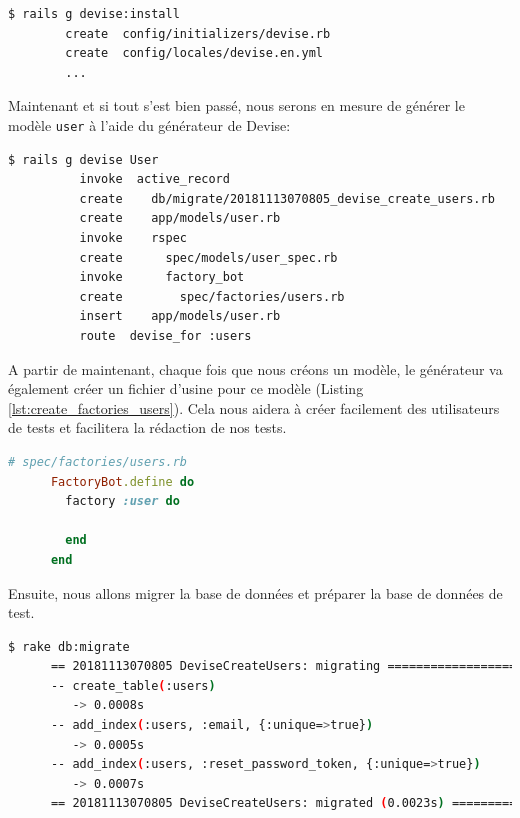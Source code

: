 \documentclass[]{report}
\begin{document}
    \begin{scriptsize}
      \begin{lstlisting}[language=bash]
      $ rails g devise:install
        create  config/initializers/devise.rb
        create  config/locales/devise.en.yml
        ...
      \end{lstlisting}
    \end{scriptsize}

    Maintenant et si tout s'est bien passé, nous serons en mesure de générer le modèle \verb|user| à l'aide du générateur de Devise:

    \begin{scriptsize}
      \begin{lstlisting}[language=bash]
      $ rails g devise User
          invoke  active_record
          create    db/migrate/20181113070805_devise_create_users.rb
          create    app/models/user.rb
          invoke    rspec
          create      spec/models/user_spec.rb
          invoke      factory_bot
          create        spec/factories/users.rb
          insert    app/models/user.rb
          route  devise_for :users
      \end{lstlisting}
    \end{scriptsize}

    A partir de maintenant, chaque fois que nous créons un modèle, le générateur va également créer un fichier d'usine pour ce modèle (Listing \ref{lst:create_factories_users}). Cela nous aidera à créer facilement des utilisateurs de tests et facilitera la rédaction de nos tests.

    \begin{scriptsize}
      \begin{lstlisting}[language=ruby, caption={Usine d'utilsateurs}, label={lst:create_factories_users}]
      # spec/factories/users.rb
      FactoryBot.define do
        factory :user do

        end
      end
      \end{lstlisting}
    \end{scriptsize}

    Ensuite, nous allons migrer la base de données et préparer la base de données de test.

    \begin{scriptsize}
      \begin{lstlisting}[language=bash]
      $ rake db:migrate
      == 20181113070805 DeviseCreateUsers: migrating ================================
      -- create_table(:users)
         -> 0.0008s
      -- add_index(:users, :email, {:unique=>true})
         -> 0.0005s
      -- add_index(:users, :reset_password_token, {:unique=>true})
         -> 0.0007s
      == 20181113070805 DeviseCreateUsers: migrated (0.0023s) =======================
      \end{lstlisting}
    \end{scriptsize}
\end{document}
